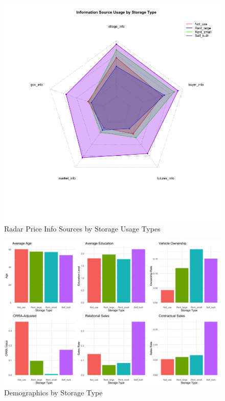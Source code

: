 \documentclass[12pt]{article}
\begin{document}
\begin{figure}[H]
\centering
\includegraphics[width=1\textwidth]{figures/radar_storage_info.png}
\caption{Radar Price Info Sources by Storage Usage Types}
\label{Figure: radar}
\end{figure}

\begin{figure}[H]
\centering
\includegraphics[width=1\textwidth]{figures/combined_storage_metrics.png}
\caption{Demographics by Storage Type}
\label{Figure: Demographics by Storage Type}
\end{figure}
\end{document}
